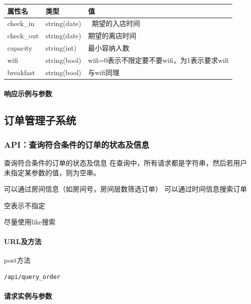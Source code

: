 \documentclass[]{article}
\let\oldparagraph\paragraph
\renewcommand{\paragraph}[1]{\oldparagraph{#1}\mbox{}}
\begin{document}
\begin{longtable}[]{@{}lll@{}}
\toprule
属性名 & 类型 & 值\tabularnewline
\midrule
\endhead
check\_in & string(date) & 期望的入店时间\tabularnewline
check\_out & string(date) & 期望的离店时间\tabularnewline
capacity & string(int) & 最小容纳人数\tabularnewline
wifi & string(bool) &
wifi=0表示不限定要不要wifi，为1表示要求wifi\tabularnewline
breakfast & string(bool) & 与wifi同理\tabularnewline
\bottomrule
\end{longtable}

\hypertarget{ux54cdux5e94ux793aux4f8bux4e0eux53c2ux6570-11}{%
\paragraph{响应示例与参数}\label{ux54cdux5e94ux793aux4f8bux4e0eux53c2ux6570-11}}

\hypertarget{ux8ba2ux5355ux7ba1ux7406ux5b50ux7cfbux7edf}{%
\subsection{订单管理子系统}\label{ux8ba2ux5355ux7ba1ux7406ux5b50ux7cfbux7edf}}

\hypertarget{apiux67e5ux8be2ux7b26ux5408ux6761ux4ef6ux7684ux8ba2ux5355ux7684ux72b6ux6001ux53caux4fe1ux606f}{%
\subsubsection{API：查询符合条件的订单的状态及信息}\label{apiux67e5ux8be2ux7b26ux5408ux6761ux4ef6ux7684ux8ba2ux5355ux7684ux72b6ux6001ux53caux4fe1ux606f}}

查询符合条件的订单的状态及信息
在查询中，所有请求都是字符串，然后若用户未指定某参数的值，则为空串。

可以通过房间信息（如房间号，房间层数筛选订单） 可以通过时间信息搜索订单

空表示不指定

尽量使用like搜索

\hypertarget{urlux53caux65b9ux6cd5}{%
\paragraph{URL及方法}\label{urlux53caux65b9ux6cd5}}

post方法

\texttt{/api/query\_order}

\hypertarget{ux8bf7ux6c42ux5b9eux4f8bux4e0eux53c2ux6570-2}{%
\paragraph{请求实例与参数}\label{ux8bf7ux6c42ux5b9eux4f8bux4e0eux53c2ux6570-2}}
\end{document}
